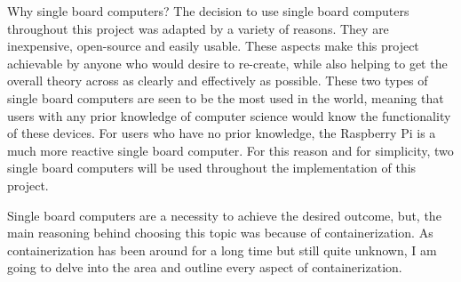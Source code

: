 \pagebreak Why single board computers? The decision to use single board computers throughout this project was adapted by a variety of reasons. They are inexpensive, open-source and easily usable. These aspects make this project achievable by anyone who would desire to re-create, while also helping to get the overall theory across as clearly and effectively as possible. These two types of single board computers are seen to be the most used in the world, meaning that users with any prior knowledge of computer science would know the functionality of these devices. For users who have no prior knowledge, the Raspberry Pi is a much more reactive single board computer. For this reason and for simplicity, two single board computers will be used throughout the implementation of this project. 

Single board computers are a necessity to achieve the desired outcome, but, the main reasoning behind choosing this topic was because of containerization. As containerization has been around for a long time but still quite unknown, I am going to delve into the area and outline every aspect of containerization.

